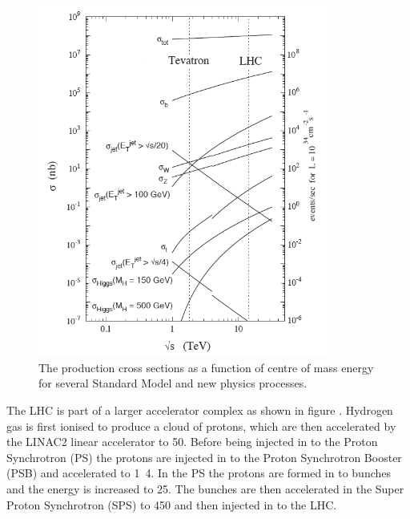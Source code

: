 \begin{figure}[htbp]
  \centering
  \includegraphics[width=0.85\textwidth]{xsec.png}
  \caption{The production cross sections as a function of centre of mass energy
for several Standard Model and new physics processes.}
  \label{fig:LHCxsec}
\end{figure}

The LHC is part of a larger accelerator complex as shown in figure
. Hydrogen gas is first ionised to produce a cloud of
protons, which are then accelerated by the LINAC2 linear accelerator to
\unit{50}{\MeV}.  Before being injected in to the Proton Synchrotron (PS) the
protons are injected in to the Proton Synchrotron Booster (PSB) and accelerated
to \unit{1.4}{\GeV}. In the PS the protons are formed in to bunches and the
energy is increased to \unit{25}{\GeV}. The bunches are then accelerated in the
Super Proton Synchrotron (SPS) to \unit{450}{\GeV} and then injected in to the
LHC.

